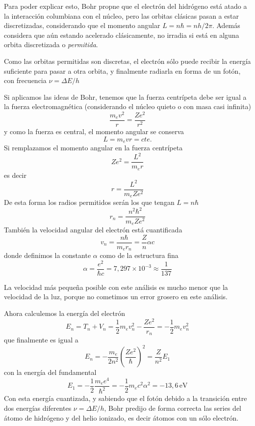 Para poder explicar esto, Bohr propne que el electrón del hidrógeno está atado a la interacción columbiana con el núcleo, pero las orbitas clásicas pasan a estar discretizadas, considerando que el momento angular $L = n\hbar = n h/2\pi$.
Además considera que aún estando acelerado clásicamente, no irradia si está en alguna orbita discretizada o \emph{permitida}.

Como las orbitas permitidas son discretas, el electrón sólo puede recibir la energía suficiente para pasar a otra orbita, y finalmente radiarla en forma de un fotón, con frecuencia $\nu = \Delta E / h$

Si aplicamos las ideas de Bohr, tenemos que la fuerza centrípeta debe ser igual a la fuerza electromagnética (considerando el núcleo quieto o con masa casi infinita)
\[ \frac{m_e v^2}{r} = \frac{Z e^2}{r^2} \]
y como la fuerza es central, el momento angular se conserva
\[ L = m_e v r = cte.\]
Si remplazamos el momento angular en la fuerza centrípeta
\[ Z e^2 = \frac{L^2}{m_e r}\]
es decir
\[ r = \frac{L^2}{m_e Z e^2}\]
De esta forma los radios permitidos serán los que tengan $L = n\hbar$
\begin{equation}
    r_n = \frac{n^2 \hbar^2}{m_e Z e^2}
\end{equation}
También la velocidad angular del electrón está cuantificada
\begin{equation}
    v_n = \frac{n\hbar}{m_e r_n} = \frac{Z}{n} \alpha c
\end{equation}
donde definimos la constante $\alpha$ como de la estructura fina
\begin{equation}
    \alpha = \frac{e^2}{\hbar c} = 7,297 \times 10^{-3} \approx \frac{1}{137}
\end{equation}

La velocidad más pequeña posible con este análisis es mucho menor que la velocidad de la luz, porque no cometimos un error grosero en este análisis.

Ahora calculemos la energía del electrón
\[ E_n = T_n + V_n = \frac{1}{2} m_e v^2_n - \frac{Z e^2}{r_n} = - \frac{1}{2} m_e v^2_n\]
que finalmente es igual a
\begin{equation}
    E_n = -\frac{m_e}{2n^2}\left(\frac{Z e^2}{\hbar}\right)^2 = \frac{Z}{n^2} E_1
\end{equation}
con la energía del fundamental
\begin{equation}
    E_1 = - \frac{1}{2} \frac{m_e e^4}{\hbar^2} = -\frac{1}{2} m_e c^2 \alpha^2 = -13,6\,\text{eV}
\end{equation}
Con esta energía cuantizada, y sabiendo que el fotón debido a la transición entre dos energías diferentes $\nu = \Delta E / h$, Bohr predijo de forma correcta las series del átomo de hidrógeno y del helio ionizado, es decir átomos con un sólo electrón.

